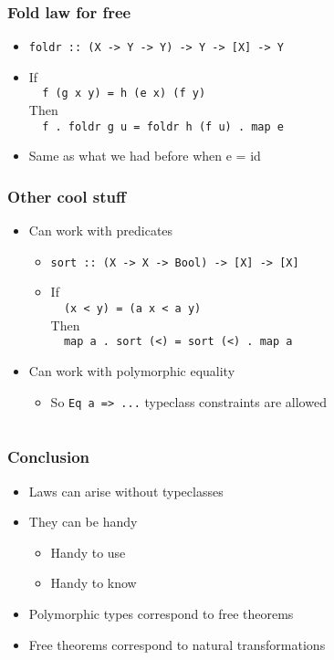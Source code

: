 \documentclass{beamer}
\begin{document}
\begin{frame}[fragile]
    \frametitle{Fold law for free}
\begin{itemize}
    \item \verb?foldr :: (X -> Y -> Y) -> Y -> [X] -> Y?\\
    \item If\\ 
    \verb?  f (g x y) = h (e x) (f y)?\\
    Then \\
    \verb?  f . foldr g u = foldr h (f u) . map e?
    \item Same as what we had before when e = id
\end{itemize}
\end{frame}

\begin{frame}[fragile]
    \frametitle{Other cool stuff}
\begin{itemize}
    \item Can work with predicates
        \begin{itemize}
            \item \verb?sort :: (X -> X -> Bool) -> [X] -> [X]?\\
            \item If\\
            \verb?  (x < y) = (a x < a y)?\\
            Then \\
            \verb?  map a . sort (<) = sort (<) . map a?
        \end{itemize}
    \item Can work with polymorphic equality
        \begin{itemize}
            \item So \verb?Eq a => ...? typeclass constraints are allowed
        \end{itemize}
\end{itemize}
\end{frame}

\section*{}

\begin{frame}
    \frametitle{Conclusion}
    \begin{itemize}
        \item Laws can arise without typeclasses   
        \item They can be handy
        \begin{itemize}
            \item Handy to use
            \item Handy to know
        \end{itemize}
        \item Polymorphic types correspond to free theorems
        \item Free theorems correspond to natural transformations
    \end{itemize}
\end{frame}
\end{document}
